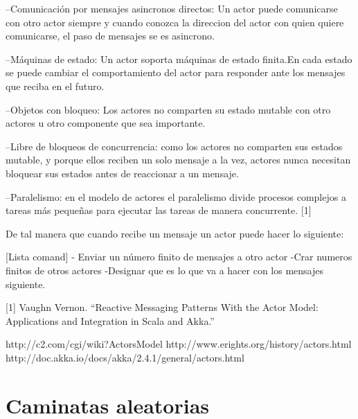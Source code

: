 --Comunicaci\'on por mensajes asincronos directos: Un actor puede comunicarse con otro actor siempre y cuando conozca la direccion del actor con quien quiere comunicarse, el paso de mensajes se es asincrono.


--M\'aquinas de estado: Un actor soporta m\'aquinas de estado finita.En cada estado  se puede cambiar el comportamiento del actor para responder ante los mensajes que reciba en el futuro.

--Objetos con bloqueo: Los actores no comparten su estado mutable con otro actores u otro componente que sea importante.

--Libre de bloqueos de concurrencia: como los actores no comparten sus estados mutable, y porque ellos reciben un solo mensaje a la vez, actores nunca necesitan bloquear sus estados antes de reaccionar a un mensaje.

--Paralelismo: en el modelo de actores el paralelismo divide procesos complejos a tareas m\'as peque\~nas para ejecutar las tareas de manera concurrente. [1]



De tal manera que cuando recibe un mensaje un actor  puede hacer lo siguiente:

[Lista  comand]
- Enviar un n\'umero finito de mensajes a otro actor
-Crar numeros finitos de otros actores
-Designar  que es lo que  va a hacer con los mensajes siguiente.



[1] Vaughn Vernon. “Reactive Messaging Patterns With the Actor Model: Applications and Integration in Scala and Akka.”

http://c2.com/cgi/wiki?ActorsModel
http://www.erights.org/history/actors.html
http://doc.akka.io/docs/akka/2.4.1/general/actors.html

\section {Caminatas aleatorias}
